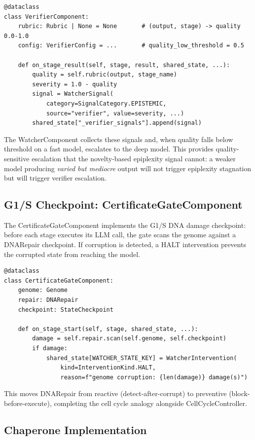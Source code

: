 \begin{verbatim}
@dataclass
class VerifierComponent:
    rubric: Rubric | None = None       # (output, stage) -> quality 0.0-1.0
    config: VerifierConfig = ...       # quality_low_threshold = 0.5

    def on_stage_result(self, stage, result, shared_state, ...):
        quality = self.rubric(output, stage_name)
        severity = 1.0 - quality
        signal = WatcherSignal(
            category=SignalCategory.EPISTEMIC,
            source="verifier", value=severity, ...)
        shared_state["_verifier_signals"].append(signal)
\end{verbatim}

The WatcherComponent collects these signals and, when quality falls below threshold on a fast model,
escalates to the deep model.  This provides quality-sensitive escalation that the novelty-based
epiplexity signal cannot: a weaker model producing \emph{varied but mediocre} output will not
trigger epiplexity stagnation but will trigger verifier escalation.

\subsection{G1/S Checkpoint: CertificateGateComponent}

The CertificateGateComponent implements the G1/S DNA damage checkpoint: before each stage
executes its LLM call, the gate scans the genome against a DNARepair checkpoint.  If corruption
is detected, a HALT intervention prevents the corrupted state from reaching the model.

\begin{verbatim}
@dataclass
class CertificateGateComponent:
    genome: Genome
    repair: DNARepair
    checkpoint: StateCheckpoint

    def on_stage_start(self, stage, shared_state, ...):
        damage = self.repair.scan(self.genome, self.checkpoint)
        if damage:
            shared_state[WATCHER_STATE_KEY] = WatcherIntervention(
                kind=InterventionKind.HALT,
                reason=f"genome corruption: {len(damage)} damage(s)")
\end{verbatim}

This moves DNARepair from reactive (detect-after-corrupt) to preventive (block-before-execute),
completing the cell cycle analogy alongside CellCycleController.

\subsection{Chaperone Implementation}

